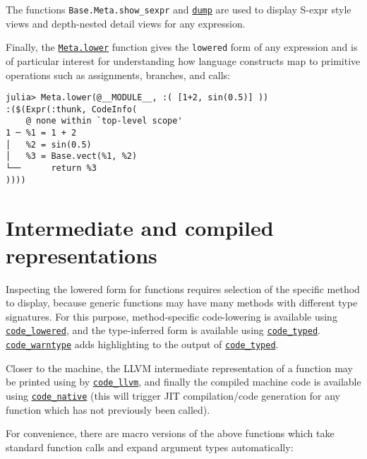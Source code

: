 The functions \texttt{Base.Meta.show\_sexpr} and \hyperlink{15981569052160951906}{\texttt{dump}} are used to display S-expr style views and depth-nested detail views for any expression.



Finally, the \hyperlink{6644553029841096787}{\texttt{Meta.lower}} function gives the \texttt{lowered} form of any expression and is of particular interest for understanding how language constructs map to primitive operations such as assignments, branches, and calls:




\begin{verbatim}
julia> Meta.lower(@__MODULE__, :( [1+2, sin(0.5)] ))
:($(Expr(:thunk, CodeInfo(
    @ none within `top-level scope'
1 ─ %1 = 1 + 2
│   %2 = sin(0.5)
│   %3 = Base.vect(%1, %2)
└──      return %3
))))
\end{verbatim}



\hypertarget{5101839880113461479}{}


\section{Intermediate and compiled representations}



Inspecting the lowered form for functions requires selection of the specific method to display, because generic functions may have many methods with different type signatures. For this purpose, method-specific code-lowering is available using \hyperlink{18235967286596219009}{\texttt{code\_lowered}}, and the type-inferred form is available using \hyperlink{14801595959157535515}{\texttt{code\_typed}}. \hyperlink{5565852192659724503}{\texttt{code\_warntype}} adds highlighting to the output of \hyperlink{14801595959157535515}{\texttt{code\_typed}}.



Closer to the machine, the LLVM intermediate representation of a function may be printed using by \hyperlink{1749471484368489435}{\texttt{code\_llvm}}, and finally the compiled machine code is available using \hyperlink{2534314152947301270}{\texttt{code\_native}} (this will trigger JIT compilation/code generation for any function which has not previously been called).



For convenience, there are macro versions of the above functions which take standard function calls and expand argument types automatically:




